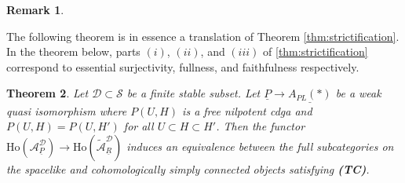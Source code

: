\documentclass[12pt,a4paper]{article}
\newtheorem{thm}{Theorem}[section]
\theoremstyle{definition}
\newtheorem{rem}[thm]{Remark}
\begin{document}
\begin{rem}
\end{rem}

The following theorem is in essence a translation of Theorem \ref{thm:strictification}. In the theorem below, parts $(i)$, $(ii)$, and $(iii)$ of \ref{thm:strictification} correspond to essential surjectivity, fullness, and faithfulness respectively.

\begin{thm}\label{thm:categorystricitification}
Let $\mathcal{D}\subset \mathcal{S}$ be a finite stable subset. Let $\underline{P}\rightarrow \underline{A_{PL}(*)}$ be a weak quasi isomorphism where $P(U,H)$ is a free nilpotent cdga and $P(U,H)=P(U,H')$ for all $U\subset H\subset H'$. Then the functor $\mathrm{Ho}(\mathcal{A}^{\mathcal{D}}_{\underline{P}})\rightarrow \mathrm{Ho}(\widetilde{\mathcal{A}}^\mathcal{D}_{\underline{R}})$ induces an equivalence between the full subcategories on the spacelike and cohomologically simply connected objects satisfying \textbf{(TC)}.
\end{thm}
\end{document}
